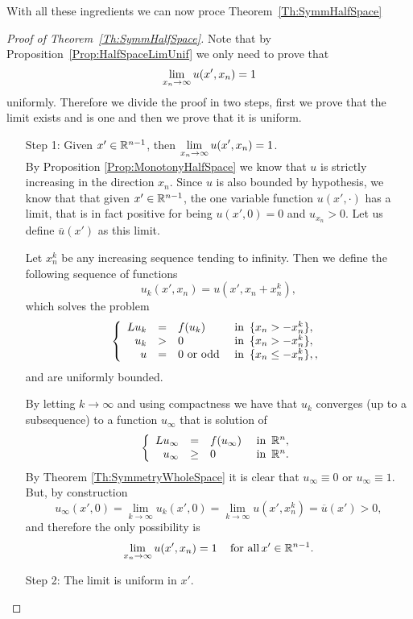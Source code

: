 With all these ingredients we can now proce Theorem~\ref{Th:SymmHalfSpace}

\begin{proof}[Proof of Theorem~\ref{Th:SymmHalfSpace}]
Note that by Proposition~\ref{Prop:HalfSpaceLimUnif} we only need to prove that 
$$
\displaystyle \lim_{x_n\to \infty} u(x',x_n) = 1
$$
uniformly. Therefore we divide the proof in two steps, first we prove that the limit exists and is one and then we prove that it is uniform.
\begin{enumerate}
\item[Step 1:] Given $x'\in \mathbb{R}^{n-1}$, then  $\displaystyle \lim_{x_n\to \infty} u(x',x_n) = 1$.\\

By Proposition \ref{Prop:MonotonyHalfSpace} we know that $u$ is strictly increasing in the direction $x_n$. Since $u$ is also bounded by hypothesis, we know that that given $x'\in\mathbb{R}^{n-1}$, the one variable function $u(x',\cdot)$ has a limit, that is in fact positive for being $u(x',0) = 0$ and $u_{x_n}>0$. Let us define $\overline{u}(x')$ as this limit.

Let $x_n^k$ be any increasing sequence tending to infinity. Then we define the following sequence of functions
$$ u_k(x',x_n) = u(x',x_n+x_n^k), $$
which solves the problem
\begin{equation}
\left\{\begin{array}{rcll}
Lu_k &=& f(u_k)   &\textrm{ in } \,\{x_n>-x_n^k\},\\
u_k &>& 0   &\textrm{ in } \,\{x_n>-x_n^k\},\\
u &=& 0 \,\, \text{or odd}  &\textrm{ in } \,\{x_n\leq-x_n^k\},,
\end{array} \right.
\end{equation}
and are uniformly bounded.

By letting $k\to\infty$ and using compactness \todo{!!!!} we have that $u_k$ converges (up to a subsequence) to a function $u_\infty$ that is solution of
\begin{equation}
\left\{\begin{array}{rcll}
Lu_\infty &=& f(u_\infty)   &\textrm{ in } \,\mathbb{R}^n,\\
u_\infty &\geq& 0   &\textrm{ in } \,\mathbb{R}^n.
\end{array} \right.
\end{equation}
By Theorem \ref{Th:SymmetryWholeSpace} it is clear that $u_\infty\equiv 0$ or $u_\infty \equiv 1$. But, by construction
$$ u_\infty(x',0) = \lim_{k\to \infty} u_k(x',0) = \lim_{k\to \infty} u(x',x_n^k) = \overline{u}(x') > 0, $$
and therefore the only possibility is
$$ \lim_{x_n\to \infty} u(x',x_n) = 1 \,\,\,\,\, \text{ for all} \, x'\in\mathbb{R}^{n-1}. $$

\item[Step 2:] The limit is uniform in $x'$.


\end{enumerate}
\end{proof}
